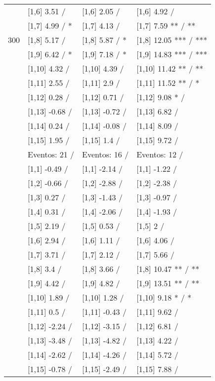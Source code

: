 \begin{table}
\begin{tabular}[t]{llll}
 & {}[1,6] 3.51  / & {}[1,6] 2.05  / & {}[1,6] 4.92  /\\
 & {}[1,7] 4.99  / * & {}[1,7] 4.13  / & {}[1,7] 7.59 ** / **\\
300 & {}[1,8] 5.17  / & {}[1,8] 5.87  / * & {}[1,8] 12.05 *** / ***\\
\addlinespace
 & {}[1,9] 6.42  / * & {}[1,9] 7.18  / * & {}[1,9] 14.83 *** / ***\\
 & {}[1,10] 4.32  / & {}[1,10] 4.39  / & {}[1,10] 11.42 ** / **\\
 & {}[1,11] 2.55  / & {}[1,11] 2.9  / & {}[1,11] 11.52 ** / *\\
 & {}[1,12] 0.28  / & {}[1,12] 0.71  / & {}[1,12] 9.08 * /\\
 & {}[1,13] -0.68  / & {}[1,13] -0.72  / & {}[1,13] 6.82  /\\
\addlinespace
 & {}[1,14] 0.24  / & {}[1,14] -0.08  / & {}[1,14] 8.09  /\\
 & {}[1,15] 1.95  / & {}[1,15] 1.4  / & {}[1,15] 9.72  /\\
 & Eventos:  21 / & Eventos:  16 / & Eventos:  12 /\\
 & {}[1,1] -0.49  / & {}[1,1] -2.14  / & {}[1,1] -1.22  /\\
 & {}[1,2] -0.66  / & {}[1,2] -2.88  / & {}[1,2] -2.38  /\\
\addlinespace
 & {}[1,3] 0.27  / & {}[1,3] -1.43  / & {}[1,3] -0.97  /\\
 & {}[1,4] 0.31  / & {}[1,4] -2.06  / & {}[1,4] -1.93  /\\
 & {}[1,5] 2.19  / & {}[1,5] 0.53  / & {}[1,5] 2  /\\
 & {}[1,6] 2.94  / & {}[1,6] 1.11  / & {}[1,6] 4.06  /\\
 & {}[1,7] 3.71  / & {}[1,7] 2.12  / & {}[1,7] 5.66  /\\
\addlinespace
500 & {}[1,8] 3.4  / & {}[1,8] 3.66  / & {}[1,8] 10.47 ** / **\\
 & {}[1,9] 4.42  / & {}[1,9] 4.82  / & {}[1,9] 13.51 ** / **\\
 & {}[1,10] 1.89  / & {}[1,10] 1.28  / & {}[1,10] 9.18 * / *\\
 & {}[1,11] 0.5  / & {}[1,11] -0.43  / & {}[1,11] 9.62  /\\
 & {}[1,12] -2.24  / & {}[1,12] -3.15  / & {}[1,12] 6.81  /\\
\addlinespace
 & {}[1,13] -3.48  / & {}[1,13] -4.82  / & {}[1,13] 4.22  /\\
 & {}[1,14] -2.62  / & {}[1,14] -4.26  / & {}[1,14] 5.72  /\\
 & {}[1,15] -0.78  / & {}[1,15] -2.49  / & {}[1,15] 7.88  /\\
\bottomrule
\end{tabular}
\end{table}

